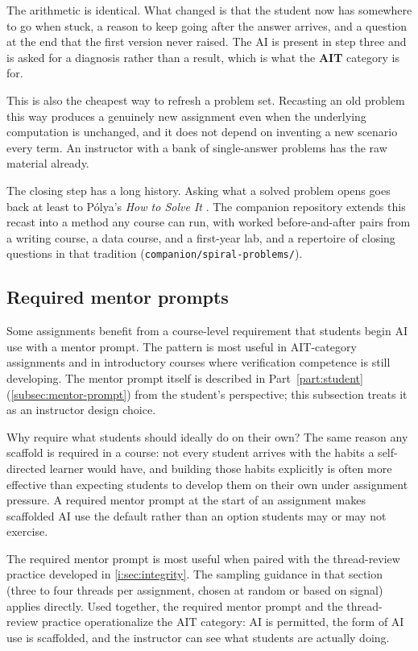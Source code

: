 \documentclass{SIAMbook2023}
\newcommand{\AIT}{\textcolor{catAIT}{\textbf{AIT}}}
\begin{document}
The arithmetic is identical. What changed is that the student now has somewhere to go when stuck, a reason to keep going after the answer arrives, and a question at the end that the first version never raised. The AI is present in step three and is asked for a diagnosis rather than a result, which is what the \AIT{} category is for.

This is also the cheapest way to refresh a problem set. Recasting an old problem this way produces a genuinely new assignment even when the underlying computation is unchanged, and it does not depend on inventing a new scenario every term. An instructor with a bank of single-answer problems has the raw material already.

The closing step has a long history. Asking what a solved problem opens goes back at least to P\'olya's \emph{How to Solve It} \citep{polya1945solve}. The companion repository extends this recast into a method any course can run, with worked before-and-after pairs from a writing course, a data course, and a first-year lab, and a repertoire of closing questions in that tradition (\texttt{companion/spiral-problems/}).

\subsection{Required mentor prompts}
\label{i:subsec:required-mentor}%

Some assignments benefit from a course-level requirement that students begin AI use with a mentor prompt. The pattern is most useful in AIT-category assignments and in introductory courses where verification competence is still developing. The mentor prompt itself is described in Part~\ref{part:student} (\cref{subsec:mentor-prompt}) from the student's perspective; this subsection treats it as an instructor design choice.

Why require what students should ideally do on their own? The same reason any scaffold is required in a course: not every student arrives with the habits a self-directed learner would have, and building those habits explicitly is often more effective than expecting students to develop them on their own under assignment pressure. A required mentor prompt at the start of an assignment makes scaffolded AI use the default rather than an option students may or may not exercise.

The required mentor prompt is most useful when paired with the thread-review practice developed in \cref{i:sec:integrity}. The sampling guidance in that section (three to four threads per assignment, chosen at random or based on signal) applies directly. Used together, the required mentor prompt and the thread-review practice operationalize the AIT category: AI is permitted, the form of AI use is scaffolded, and the instructor can see what students are actually doing.
\end{document}
